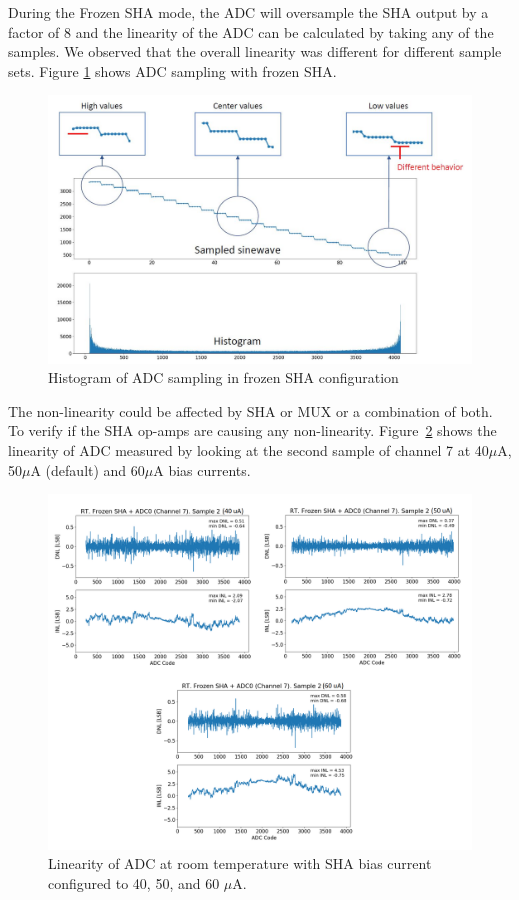 During the Frozen SHA mode, the ADC will oversample the SHA output by a factor of 8 and the linearity of the ADC can be calculated by taking any of the samples. We observed that the overall linearity was different for different sample sets. Figure \ref{fig:sha_sample_hist} shows ADC sampling with frozen SHA.
\begin{figure}[h!]
\centering
  \includegraphics[width=0.7\linewidth]{figures/prakash_fig/sha_sample_hist.JPG}
  \caption{Histogram of ADC sampling in frozen SHA configuration}
  \label{fig:sha_sample_hist}
\end{figure}
The non-linearity could be affected by SHA or MUX or a combination of both. To verify if the SHA op-amps are causing any non-linearity. Figure~\ref{fig:linearity_sha_current} shows the linearity of ADC measured by looking at the second sample of channel 7 at 40$\mu$A, 50$\mu$A (default) and 60$\mu$A bias currents. 
\begin{figure}[h!]
\centering
  \includegraphics[width=1.0\linewidth]{figures/prakash_fig/linearity_sha_current.png}
  \caption{Linearity of ADC at room temperature with SHA bias current configured to 40, 50, and 60 $\mu$A.}
  \label{fig:linearity_sha_current}
\end{figure}
